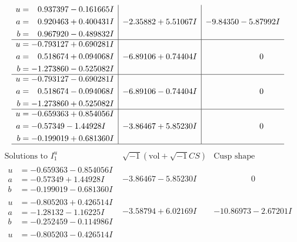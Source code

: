 \documentclass[1p]{elsarticle_modified}
\theoremstyle{definition}
\newcommand{\I}{\sqrt{-1}}
\begin{document}
$$\begin{array}{c|c|c}
\begin{aligned}
u &= \phantom{-}0.937397 - 0.161665 I \\
a &= \phantom{-}0.920463 + 0.400431 I \\
b &= \phantom{-}0.967920 - 0.489832 I\end{aligned}
 & -2.35882 + 5.51067 I & -9.84350 - 5.87992 I \\ \hline\begin{aligned}
u &= -0.793127 + 0.690281 I \\
a &= \phantom{-}0.518674 + 0.094068 I \\
b &= -1.273860 - 0.525082 I\end{aligned}
 & -6.89106 + 0.74404 I & \phantom{-0.000000 } 0 \\ \hline\begin{aligned}
u &= -0.793127 - 0.690281 I \\
a &= \phantom{-}0.518674 - 0.094068 I \\
b &= -1.273860 + 0.525082 I\end{aligned}
 & -6.89106 - 0.74404 I & \phantom{-0.000000 } 0 \\ \hline\begin{aligned}
u &= -0.659363 + 0.854056 I \\
a &= -0.57349 - 1.44928 I \\
b &= -0.199019 + 0.681360 I\end{aligned}
 & -3.86467 + 5.85230 I & \phantom{-0.000000 } 0\\
 \hline 
 \end{array}$$\newpage$$\begin{array}{c|c|c}  
\text{Solutions to }I^u_{1}& \I (\text{vol} + \sqrt{-1}CS) & \text{Cusp shape}\\
 \hline 
\begin{aligned}
u &= -0.659363 - 0.854056 I \\
a &= -0.57349 + 1.44928 I \\
b &= -0.199019 - 0.681360 I\end{aligned}
 & -3.86467 - 5.85230 I & \phantom{-0.000000 } 0 \\ \hline\begin{aligned}
u &= -0.805203 + 0.426514 I \\
a &= -1.28132 - 1.16225 I \\
b &= -0.252459 - 0.114986 I\end{aligned}
 & -3.58794 + 6.02169 I & -10.86973 - 2.67201 I \\ \hline\begin{aligned}
u &= -0.805203 - 0.426514 I \\

\end{aligned}
\end{array}$$
\end{document}
